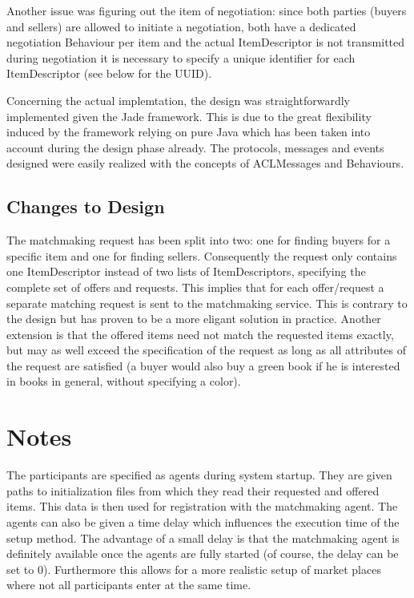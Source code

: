 \documentclass[a4paper,11pt]{article}
\begin{document}
Another issue was figuring out the item of negotiation: since both parties (buyers and sellers) are allowed to initiate a negotiation, both have a dedicated negotiation Behaviour per item and the actual ItemDescriptor is not transmitted during negotiation it is necessary to specify a unique identifier for each ItemDescriptor (see below for the UUID).

Concerning the actual implemtation, the design was straightforwardly implemented given the Jade framework. This is due to the great flexibility induced by the framework relying on pure Java which has been taken into account during the design phase already. The protocols, messages and events designed were easily realized with the concepts of ACLMessages and Behaviours.

\subsection{Changes to Design}
The matchmaking request has been split into two: one for finding buyers for a specific item and one for finding sellers. Consequently the request only contains one ItemDescriptor instead of two lists of ItemDescriptors, specifying the complete set of offers and requests. This implies that for each offer/request a separate matching request is sent to the matchmaking service. This is contrary to the design but has proven to be a more eligant solution in practice. Another extension is that the offered items need not match the requested items exactly, but may as well exceed the specification of the request as long as all attributes of the request are satisfied (a buyer would also buy a green book if he is interested in books in general, without specifying a color).

\section{Notes}
The participants are specified as agents during system startup. They are given paths to initialization files from which they read their requested and offered items. This data is then used for registration with the matchmaking agent. The agents can also be given a time delay which influences the execution time of the setup method. The advantage of a small delay is that the matchmaking agent is definitely available once the agents are fully started (of course, the delay can be set to 0). Furthermore this allows for a more realistic setup of market places where not all participants enter at the same time.
\end{document}
